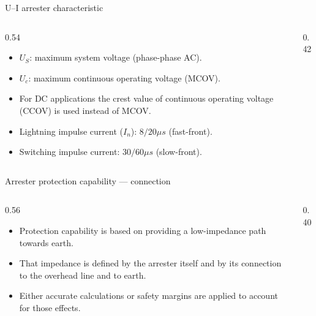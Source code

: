 \begin{frame}{U--I arrester characteristic}
  \begin{columns}[c,onlytextwidth]
    \begin{column}{0.54\textwidth}
      \begin{itemize}
        \setlength{\itemsep}{0.35em}
        \item $U_S$: maximum system voltage (phase-phase AC).
        \item $U_c$: maximum continuous operating voltage (MCOV).
        \item For DC applications the crest value of continuous operating
              voltage (CCOV) is used instead of MCOV.
        \item Lightning impulse current ($I_n$): $8/20 \mu s$
              (fast-front).
        \item Switching impulse current: $30/60 \mu s$ (slow-front).
      \end{itemize}
    \end{column}
    \begin{column}{0.42\textwidth}
      \centering
    \end{column}
  \end{columns}
\end{frame}

\begin{frame}{Arrester protection capability --- connection}
  \begin{columns}[c,onlytextwidth]
    \begin{column}{0.56\textwidth}
      \begin{itemize}
        \setlength{\itemsep}{0.4em}
        \item Protection capability is based on providing a low-impedance
              path towards earth.
        \item That impedance is defined by the arrester itself and by its
              connection to the overhead line and to earth.
        \item Either accurate calculations or safety margins are applied to
              account for those effects.
      \end{itemize}
    \end{column}
    \begin{column}{0.40\textwidth}
      \centering
    \end{column}
  \end{columns}
\end{frame}

